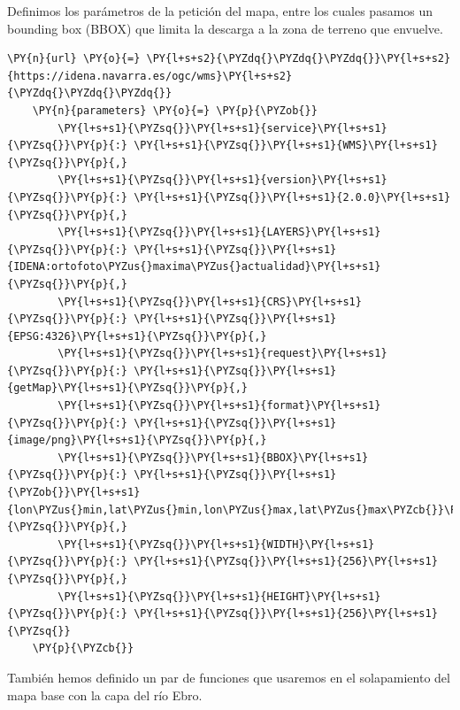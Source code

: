 Definimos los parámetros de la petición del mapa, entre los cuales pasamos un bounding box (BBOX) que limita la descarga a la zona de terreno que envuelve.
\begin{tcolorbox}[breakable, size=fbox, boxrule=1pt, pad at break*=1mm,colback=cellbackground, colframe=cellborder, fontupper=\footnotesize]
    \begin{Verbatim}[commandchars=\\\{\}]
    \PY{n}{url} \PY{o}{=} \PY{l+s+s2}{\PYZdq{}\PYZdq{}\PYZdq{}}\PY{l+s+s2}{https://idena.navarra.es/ogc/wms}\PY{l+s+s2}{\PYZdq{}\PYZdq{}\PYZdq{}}
    \PY{n}{parameters} \PY{o}{=} \PY{p}{\PYZob{}}
        \PY{l+s+s1}{\PYZsq{}}\PY{l+s+s1}{service}\PY{l+s+s1}{\PYZsq{}}\PY{p}{:} \PY{l+s+s1}{\PYZsq{}}\PY{l+s+s1}{WMS}\PY{l+s+s1}{\PYZsq{}}\PY{p}{,}
        \PY{l+s+s1}{\PYZsq{}}\PY{l+s+s1}{version}\PY{l+s+s1}{\PYZsq{}}\PY{p}{:} \PY{l+s+s1}{\PYZsq{}}\PY{l+s+s1}{2.0.0}\PY{l+s+s1}{\PYZsq{}}\PY{p}{,}
        \PY{l+s+s1}{\PYZsq{}}\PY{l+s+s1}{LAYERS}\PY{l+s+s1}{\PYZsq{}}\PY{p}{:} \PY{l+s+s1}{\PYZsq{}}\PY{l+s+s1}{IDENA:ortofoto\PYZus{}maxima\PYZus{}actualidad}\PY{l+s+s1}{\PYZsq{}}\PY{p}{,}
        \PY{l+s+s1}{\PYZsq{}}\PY{l+s+s1}{CRS}\PY{l+s+s1}{\PYZsq{}}\PY{p}{:} \PY{l+s+s1}{\PYZsq{}}\PY{l+s+s1}{EPSG:4326}\PY{l+s+s1}{\PYZsq{}}\PY{p}{,}
        \PY{l+s+s1}{\PYZsq{}}\PY{l+s+s1}{request}\PY{l+s+s1}{\PYZsq{}}\PY{p}{:} \PY{l+s+s1}{\PYZsq{}}\PY{l+s+s1}{getMap}\PY{l+s+s1}{\PYZsq{}}\PY{p}{,}
        \PY{l+s+s1}{\PYZsq{}}\PY{l+s+s1}{format}\PY{l+s+s1}{\PYZsq{}}\PY{p}{:} \PY{l+s+s1}{\PYZsq{}}\PY{l+s+s1}{image/png}\PY{l+s+s1}{\PYZsq{}}\PY{p}{,}
        \PY{l+s+s1}{\PYZsq{}}\PY{l+s+s1}{BBOX}\PY{l+s+s1}{\PYZsq{}}\PY{p}{:} \PY{l+s+s1}{\PYZsq{}}\PY{l+s+s1}{\PYZob{}}\PY{l+s+s1}{lon\PYZus{}min,lat\PYZus{}min,lon\PYZus{}max,lat\PYZus{}max\PYZcb{}}\PY{l+s+s1}{\PYZsq{}}\PY{p}{,}
        \PY{l+s+s1}{\PYZsq{}}\PY{l+s+s1}{WIDTH}\PY{l+s+s1}{\PYZsq{}}\PY{p}{:} \PY{l+s+s1}{\PYZsq{}}\PY{l+s+s1}{256}\PY{l+s+s1}{\PYZsq{}}\PY{p}{,}
        \PY{l+s+s1}{\PYZsq{}}\PY{l+s+s1}{HEIGHT}\PY{l+s+s1}{\PYZsq{}}\PY{p}{:} \PY{l+s+s1}{\PYZsq{}}\PY{l+s+s1}{256}\PY{l+s+s1}{\PYZsq{}}
    \PY{p}{\PYZcb{}}
    \end{Verbatim}
\end{tcolorbox}

También hemos definido un par de funciones que usaremos en el solapamiento del mapa base con la capa del río Ebro.

